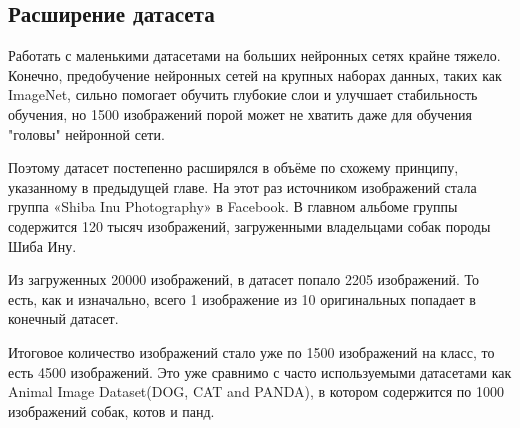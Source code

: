 \subsection{Расширение датасета}\label{sect3_3_2}
Работать с маленькими датасетами на больших нейронных сетях крайне тяжело. Конечно, предобучение нейронных сетей на крупных наборах данных, таких как ImageNet, сильно помогает обучить глубокие слои и улучшает стабильность обучения, но 1500 изображений порой может не хватить даже для обучения "головы" нейронной сети.

Поэтому датасет постепенно расширялся в объёме по схожему принципу, указанному в предыдущей главе. На этот раз источником изображений стала группа «Shiba Inu Photography» в Facebook. В главном альбоме группы содержится 120 тысяч изображений, загруженными владельцами собак породы Шиба Ину.

Из загруженных 20000 изображений, в датасет попало 2205 изображений. То есть, как и изначально, всего 1 изображение из 10 оригинальных попадает в конечный датасет.

Итоговое количество изображений стало уже по 1500 изображений на класс, то есть 4500 изображений. Это уже сравнимо с часто используемыми датасетами как Animal Image Dataset(DOG, CAT and PANDA), в котором содержится по 1000 изображений собак, котов и панд. 


%        
%        
